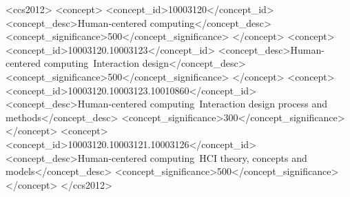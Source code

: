 \documentclass [sigconf, review, anonymous] {acmart}
\begin{document}


\begin{CCSXML}
<ccs2012>
   <concept>
       <concept_id>10003120</concept_id>
       <concept_desc>Human-centered computing</concept_desc>
       <concept_significance>500</concept_significance>
       </concept>
   <concept>
       <concept_id>10003120.10003123</concept_id>
       <concept_desc>Human-centered computing~Interaction design</concept_desc>
       <concept_significance>500</concept_significance>
       </concept>
   <concept>
       <concept_id>10003120.10003123.10010860</concept_id>
       <concept_desc>Human-centered computing~Interaction design process and methods</concept_desc>
       <concept_significance>300</concept_significance>
       </concept>
   <concept>
       <concept_id>10003120.10003121.10003126</concept_id>
       <concept_desc>Human-centered computing~HCI theory, concepts and models</concept_desc>
       <concept_significance>500</concept_significance>
       </concept>
 </ccs2012>
\end{CCSXML}




 
\maketitle
\end{document}
